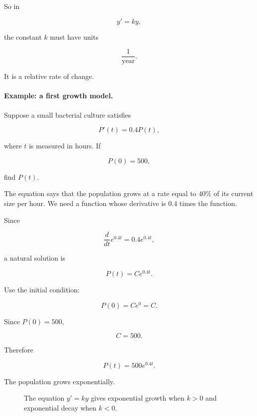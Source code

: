 So in

\[
y'=ky,
\]

the constant \(k\) must have units

\[
\frac{1}{\text{year}}.
\]

It is a relative rate of change.

\paragraph{Example: a first growth model.}
Suppose a small bacterial culture satisfies

\[
P'(t)=0.4P(t),
\]

where \(t\) is measured in hours.  If

\[
P(0)=500,
\]

find \(P(t)\).

The equation says that the population grows at a rate equal to \(40\%\) of its current
size per hour.  We need a function whose derivative is \(0.4\) times the function.

Since

\[
\frac{d}{dt}e^{0.4t}=0.4e^{0.4t},
\]

a natural solution is

\[
P(t)=Ce^{0.4t}.
\]

Use the initial condition:

\[
P(0)=Ce^0=C.
\]

Since \(P(0)=500\),

\[
C=500.
\]

Therefore

\[
\boxed{
P(t)=500e^{0.4t}.
}
\]

The population grows exponentially.

\begin{figure}[h]
\centering
{}
\caption{The equation \(y'=ky\) gives exponential growth when \(k>0\) and exponential decay when \(k<0\).}
\label{fig:exponential-growth-decay}
\end{figure}

